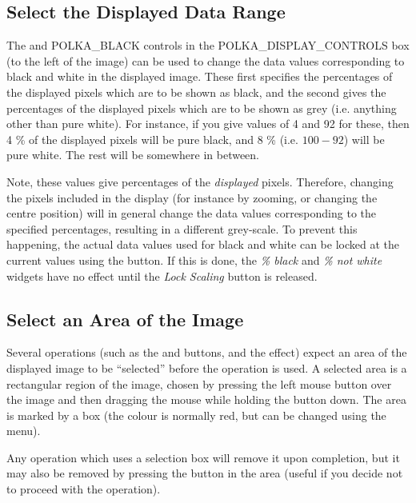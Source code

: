 \subsection {Select the Displayed Data Range}
The  and 
{POLKA_BLACK} controls in the 
{POLKA_DISPLAY_CONTROLS} box (to the left of the image) can be used to
change the data values corresponding to black and white in the displayed
image. These first specifies the percentages of the displayed pixels
which are to be shown as black, and the second gives the percentages of the 
displayed pixels which are to be shown as grey (i.e. anything other than
pure white). For instance, if you give values of 4 and 92 for these, then
4 \% of the displayed pixels will be pure black, and 8 \% (i.e. $100-92$)
will be pure white. The rest will be somewhere in between.

Note, these values give percentages of the {\em displayed} pixels.
Therefore, changing the pixels included in the display (for instance by 
zooming, or changing the centre position) will in general change the data
values corresponding to the specified percentages, resulting in a
different grey-scale. To prevent this happening, the actual data values
used for black and white can be locked at the current values using the 
 button. If this is done,
the {\em \% black} and {\em \% not white} widgets have no effect until the
{\em Lock Scaling} button is released.

\subsection {Select an Area of the Image}
Several operations (such as the  and
 buttons, and the  effect) expect an area of the displayed image
to be ``selected'' before the operation is used. A selected area is a
rectangular region of the image, chosen by pressing the left mouse button
over the image and then dragging the mouse while holding the button down.
The area is marked by a box (the colour is normally red, but can be
changed using the  menu). 

Any operation which uses a selection box will remove it upon completion,
but it may also be removed by pressing the 
button in the  area
(useful if you decide not to proceed with the operation).

